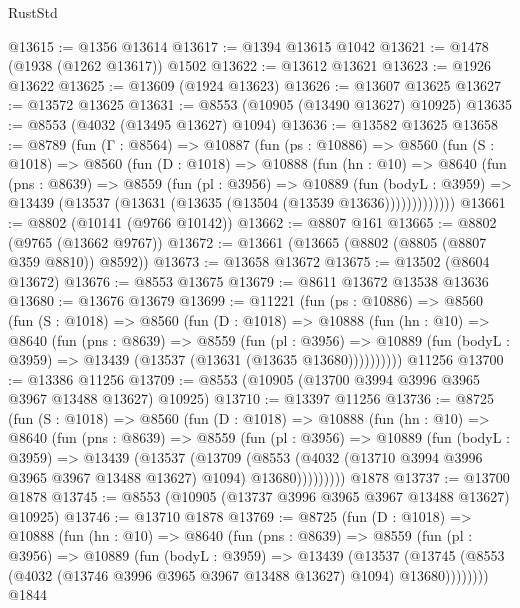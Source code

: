 \begin{lexlean}{RustStd}
\begin{coremodule}
@13615 := @1356 @13614
@13617 := @1394 @13615 @1042
@13621 := @1478 (@1938 (@1262 @13617)) @1502
@13622 := @13612 @13621
@13623 := @1926 @13622
@13625 := @13609 (@1924 @13623)
@13626 := @13607 @13625
@13627 := @13572 @13625
@13631 := @8553 (@10905 (@13490 @13627) @10925)
@13635 := @8553 (@4032 (@13495 @13627) @1094)
@13636 := @13582 @13625
@13658 := @8789
    (fun (Γ : @8564) =>
    @10887
      (fun (ps : @10886) =>
      @8560
        (fun (S : @1018) =>
        @8560
          (fun (D : @1018) =>
          @10888
            (fun (hn : @10) =>
            @8640
              (fun (pns : @8639) =>
              @8559
                (fun (pl : @3956) =>
                @10889
                  (fun (bodyL : @3959) =>
                  @13439 (@13537 (@13631 (@13635 (@13504 (@13539 @13636)))))))))))))
@13661 := @8802 (@10141 (@9766 @10142))
@13662 := @8807 @161
@13665 := @8802 (@9765 (@13662 @9767))
@13672 := @13661 (@13665 (@8802 (@8805 (@8807 @359 @8810)) @8592))
@13673 := @13658 @13672
@13675 := @13502 (@8604 @13672)
@13676 := @8553 @13675
@13679 := @8611 @13672 @13538 @13636
@13680 := @13676 @13679
@13699 := @11221
    (fun (ps : @10886) =>
    @8560
      (fun (S : @1018) =>
      @8560
        (fun (D : @1018) =>
        @10888
          (fun (hn : @10) =>
          @8640
            (fun (pns : @8639) =>
            @8559
              (fun (pl : @3956) =>
              @10889 (fun (bodyL : @3959) => @13439 (@13537 (@13631 (@13635 @13680))))))))))
    @11256
@13700 := @13386 @11256
@13709 := @8553 (@10905 (@13700 @3994 @3996 @3965 @3967 @13488 @13627) @10925)
@13710 := @13397 @11256
@13736 := @8725
    (fun (S : @1018) =>
    @8560
      (fun (D : @1018) =>
      @10888
        (fun (hn : @10) =>
        @8640
          (fun (pns : @8639) =>
          @8559
            (fun (pl : @3956) =>
            @10889
              (fun (bodyL : @3959) =>
              @13439
                (@13537
                  (@13709
                    (@8553
                      (@4032 (@13710 @3994 @3996 @3965 @3967 @13488 @13627) @1094)
                      @13680)))))))))
    @1878
@13737 := @13700 @1878
@13745 := @8553 (@10905 (@13737 @3996 @3965 @3967 @13488 @13627) @10925)
@13746 := @13710 @1878
@13769 := @8725
    (fun (D : @1018) =>
    @10888
      (fun (hn : @10) =>
      @8640
        (fun (pns : @8639) =>
        @8559
          (fun (pl : @3956) =>
          @10889
            (fun (bodyL : @3959) =>
            @13439
              (@13537
                (@13745 (@8553 (@4032 (@13746 @3996 @3965 @3967 @13488 @13627) @1094) @13680))))))))
    @1844

\end{coremodule}
\end{lexlean}
